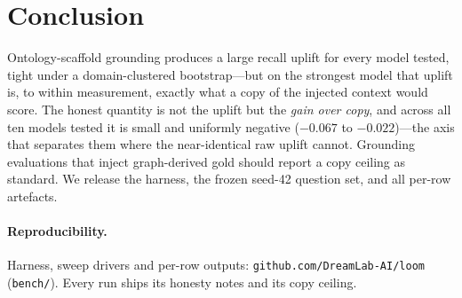 \documentclass[11pt]{article}
\begin{document}
\section{Conclusion}
Ontology-scaffold grounding produces a large recall uplift for every model
tested, tight under a domain-clustered bootstrap---but on the strongest model that uplift is, to
within measurement, exactly what a copy of the injected context would score. The honest quantity is not the uplift but the \emph{gain over
copy}, and across all ten models tested it is small and uniformly negative ($-0.067$ to
$-0.022$)---the axis that separates them where the near-identical raw uplift cannot. Grounding
evaluations that inject graph-derived gold should report a copy ceiling as standard. We release the harness, the frozen seed-42 question set, and all per-row artefacts.

\paragraph{Reproducibility.} Harness, sweep drivers and per-row outputs:
\texttt{github.com/DreamLab-AI/loom} (\texttt{bench/}). Every run ships its honesty notes and its
copy ceiling.

\printbibliography
\end{document}
